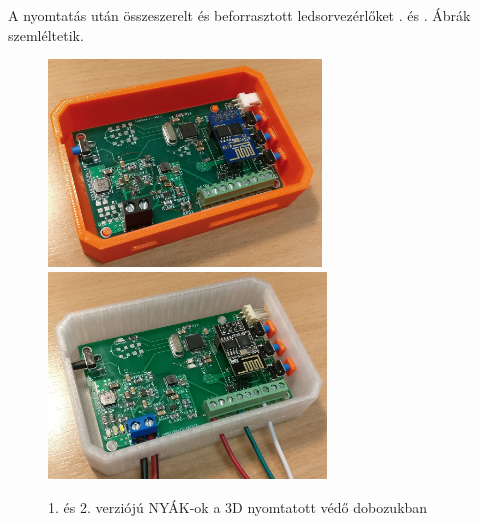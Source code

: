 \documentclass[../main.tex]{subfiles}
\begin{document}
            A nyomtatás után összeszerelt és beforrasztott ledsorvezérlőket . és . Ábrák szemléltetik.
            
            \begin{figure}[h!]
                \centering
                    \includegraphics[height=5.5cm]{resources/pcb_res/printed_case_ngen}
                    \includegraphics[height=5.5cm]{resources/pcb_res/printed_case_abs}
                    \caption{1. és 2. verziójú NYÁK-ok a 3D nyomtatott védő dobozukban}
                    \label{fig:printed_cases_1}
            \end{figure}
            
\end{document}
